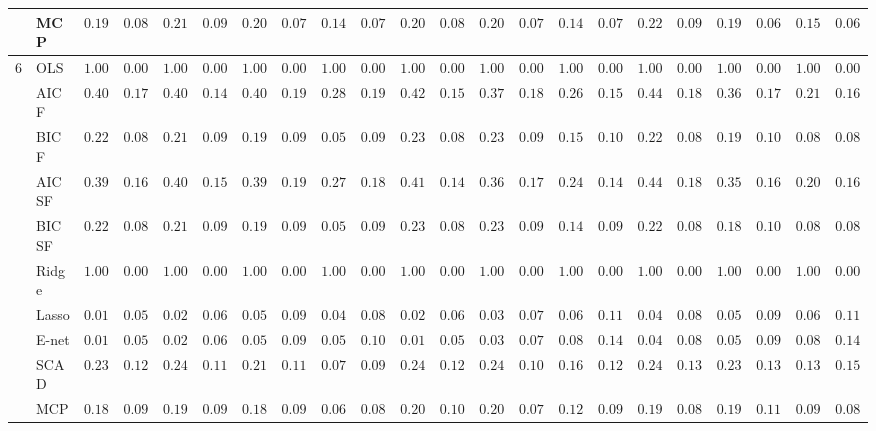 \begin{tabular}{p{0.2cm}p{1cm}|p{0.6cm}p{0.6cm}|p{0.6cm}p{0.6cm}p{0.6cm}p{0.6cm}p{0.6cm}p{0.6cm}|p{0.6cm}p{0.6cm}p{0.6cm}p{0.6cm}p{0.6cm}p{0.6cm}|p{0.6cm}p{0.6cm}p{0.6cm}p{0.6cm}p{0.6cm}p{0.6cm}}
 & MCP  & $0.1983$ & $0.0810$ & $0.2150$ & $0.0926$ & $0.2017$ & $0.0760$ & $0.1417$ & $0.0799$ & $0.2033$ & $0.0806$ & $0.2033$ & $0.0733$ & $0.1450$ & $0.0773$ & $0.2200$ & $0.0944$ & $0.1983$ & $0.0699$ & $0.1583$ & $0.0643$ \\\hline
6 & OLS  & $1.0000$ & $0.0000$ & $1.0000$ & $0.0000$ & $1.0000$ & $0.0000$ & $1.0000$ & $0.0000$ & $1.0000$ & $0.0000$ & $1.0000$ & $0.0000$ & $1.0000$ & $0.0000$ & $1.0000$ & $0.0000$ & $1.0000$ & $0.0000$ & $1.0000$ & $0.0000$ \\
 & AIC F  & $0.4000$ & $0.1708$ & $0.4000$ & $0.1498$ & $0.4033$ & $0.1999$ & $0.2850$ & $0.1958$ & $0.4217$ & $0.1525$ & $0.3717$ & $0.1833$ & $0.2633$ & $0.1502$ & $0.4450$ & $0.1820$ & $0.3633$ & $0.1714$ & $0.2133$ & $0.1693$ \\
 & BIC F  & $0.2200$ & $0.0883$ & $0.2183$ & $0.0938$ & $0.1917$ & $0.0959$ & $0.0500$ & $0.0902$ & $0.2300$ & $0.0879$ & $0.2367$ & $0.0953$ & $0.1500$ & $0.1019$ & $0.2233$ & $0.0893$ & $0.1900$ & $0.1060$ & $0.0850$ & $0.0870$ \\
 & AIC SF  & $0.3917$ & $0.1630$ & $0.4017$ & $0.1519$ & $0.3967$ & $0.1936$ & $0.2767$ & $0.1838$ & $0.4117$ & $0.1430$ & $0.3667$ & $0.1788$ & $0.2483$ & $0.1470$ & $0.4417$ & $0.1810$ & $0.3533$ & $0.1646$ & $0.2033$ & $0.1651$ \\
 & BIC SF  & $0.2200$ & $0.0883$ & $0.2183$ & $0.0938$ & $0.1900$ & $0.0977$ & $0.0500$ & $0.0902$ & $0.2300$ & $0.0879$ & $0.2367$ & $0.0953$ & $0.1483$ & $0.0974$ & $0.2233$ & $0.0893$ & $0.1883$ & $0.1077$ & $0.0850$ & $0.0870$ \\
 & Ridge  & $1.0000$ & $0.0000$ & $1.0000$ & $0.0000$ & $1.0000$ & $0.0000$ & $1.0000$ & $0.0000$ & $1.0000$ & $0.0000$ & $1.0000$ & $0.0000$ & $1.0000$ & $0.0000$ & $1.0000$ & $0.0000$ & $1.0000$ & $0.0000$ & $1.0000$ & $0.0000$ \\
 & Lasso  & $0.0183$ & $0.0575$ & $0.0250$ & $0.0686$ & $0.0550$ & $0.0978$ & $0.0417$ & $0.0866$ & $0.0200$ & $0.0639$ & $0.0333$ & $0.0749$ & $0.0683$ & $0.1114$ & $0.0400$ & $0.0825$ & $0.0533$ & $0.0914$ & $0.0650$ & $0.1133$ \\
 & E-net  & $0.0167$ & $0.0556$ & $0.0250$ & $0.0686$ & $0.0550$ & $0.0978$ & $0.0533$ & $0.1056$ & $0.0183$ & $0.0575$ & $0.0333$ & $0.0749$ & $0.0883$ & $0.1411$ & $0.0400$ & $0.0825$ & $0.0533$ & $0.0973$ & $0.0817$ & $0.1451$ \\
 & SCAD  & $0.2367$ & $0.1235$ & $0.2450$ & $0.1147$ & $0.2167$ & $0.1124$ & $0.0700$ & $0.0923$ & $0.2417$ & $0.1217$ & $0.2433$ & $0.1070$ & $0.1683$ & $0.1242$ & $0.2433$ & $0.1390$ & $0.2367$ & $0.1323$ & $0.1333$ & $0.1517$ \\
 & MCP  & $0.1883$ & $0.0907$ & $0.1933$ & $0.0909$ & $0.1800$ & $0.0938$ & $0.0650$ & $0.0851$ & $0.2067$ & $0.1036$ & $0.2050$ & $0.0780$ & $0.1233$ & $0.0906$ & $0.1967$ & $0.0898$ & $0.1900$ & $0.1137$ & $0.0967$ & $0.0827$ \\
\hline 
\end{tabular}

